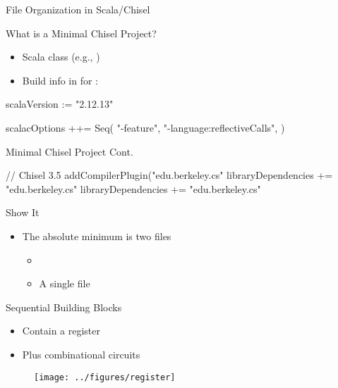 \begin{frame}[fragile]{File Organization in Scala/Chisel}
\end{frame}

\begin{frame}[fragile]{What is a Minimal Chisel Project?}
\begin{itemize}
\item Scala class (e.g., )
\item Build info in  for :
\end{itemize}
\begin{chisel}
scalaVersion := "2.12.13"

scalacOptions ++= Seq(
  "-feature",
  "-language:reflectiveCalls",
)
\end{chisel}
\end{frame}

\begin{frame}[fragile]{Minimal Chisel Project Cont.}
\begin{chisel}
// Chisel 3.5
addCompilerPlugin("edu.berkeley.cs" %
libraryDependencies += "edu.berkeley.cs" %
libraryDependencies += "edu.berkeley.cs" %
\end{chisel}
\end{frame}

\begin{frame}[fragile]{Show It}
\begin{itemize}
\item The absolute minimum is two files
\begin{itemize}
\item {}
\item A single  file
\end{itemize}
\end{itemize}
\end{frame}


\begin{frame}[fragile]{Sequential Building Blocks}
\begin{itemize}
\item Contain a register
\item Plus combinational circuits
\end{itemize}
\begin{figure}
  \texttt{[image: ../figures/register]}
\end{figure}
\end{frame}


